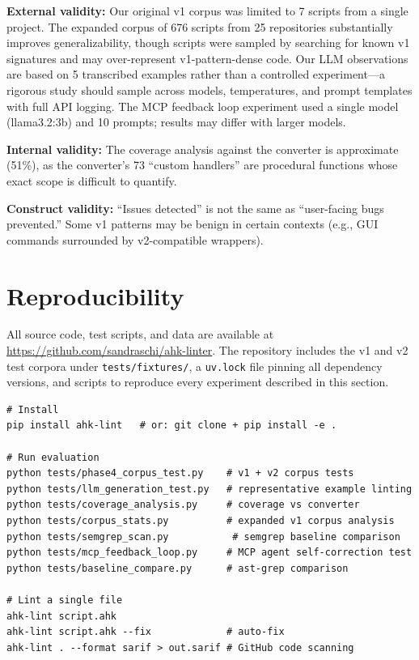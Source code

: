\documentclass[11pt,a4paper]{article}
\begin{document}
\begin{enumerate}
\textbf{External validity:} Our original v1 corpus was limited to 7 scripts from a single project. The expanded corpus of 676 scripts from 25 repositories substantially improves generalizability, though scripts were sampled by searching for known v1 signatures and may over-represent v1-pattern-dense code. Our LLM observations are based on 5 transcribed examples rather than a controlled experiment---a rigorous study should sample across models, temperatures, and prompt templates with full API logging. The MCP feedback loop experiment used a single model (llama3.2:3b) and 10 prompts; results may differ with larger models.

\textbf{Internal validity:} The coverage analysis against the converter is approximate (51\%), as the converter's 73 ``custom handlers'' are procedural functions whose exact scope is difficult to quantify.

\textbf{Construct validity:} ``Issues detected'' is not the same as ``user-facing bugs prevented.'' Some v1 patterns may be benign in certain contexts (e.g., GUI commands surrounded by v2-compatible wrappers).

\section{Reproducibility}

All source code, test scripts, and data are available at \url{https://github.com/sandraschi/ahk-linter}. The repository includes the v1 and v2 test corpora under \texttt{tests/fixtures/}, a \texttt{uv.lock} file pinning all dependency versions, and scripts to reproduce every experiment described in this section.

\begin{lstlisting}[style=ahk,frame=none,numbers=none]
# Install
pip install ahk-lint   # or: git clone + pip install -e .

# Run evaluation
python tests/phase4_corpus_test.py    # v1 + v2 corpus tests
python tests/llm_generation_test.py   # representative example linting
python tests/coverage_analysis.py     # coverage vs converter
python tests/corpus_stats.py          # expanded v1 corpus analysis
python tests/semgrep_scan.py           # semgrep baseline comparison
python tests/mcp_feedback_loop.py     # MCP agent self-correction test
python tests/baseline_compare.py      # ast-grep comparison

# Lint a single file
ahk-lint script.ahk
ahk-lint script.ahk --fix             # auto-fix
ahk-lint . --format sarif > out.sarif # GitHub code scanning


\end{lstlisting}
\end{enumerate}
\end{document}
